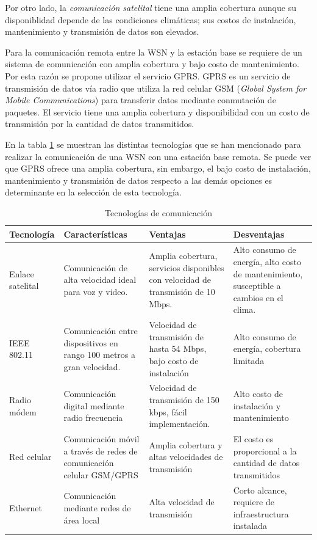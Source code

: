 Por otro lado, la \textit{comunicación satelital} tiene una amplia cobertura aunque su disponiblidad depende de las condiciones climáticas; sus costos de instalación, mantenimiento y transmisión de datos son elevados. 

Para la comunicación remota entre la WSN y la estación base se requiere de un sistema de comunicación con amplia cobertura y bajo costo de mantenimiento. Por esta razón se propone utilizar el servicio GPRS. GPRS es un servicio de transmisión de datos vía radio que utiliza la red celular GSM (\textit{Global System for Mobile Communications}) para transferir datos mediante conmutación de paquetes. El servicio tiene una amplia cobertura y disponibilidad con un costo de transmisión por la cantidad de datos transmitidos. 

En la tabla \ref{tabla:tecnologias_com} se muestran las distintas tecnolog\'ias que se han mencionado para realizar la comunicación de una WSN con una estaci\'on base remota. Se puede ver que GPRS ofrece una amplia cobertura, sin embargo, el bajo costo de instalaci\'on, mantenimiento y transmisi\'on de datos respecto a las demás opciones es determinante en la selecci\'on de esta tecnolog\'ia.  


\begin{table}
	\begin{center}
		\caption{Tecnologías de comunicación}
		\label{tabla:tecnologias_com}
		\small
		\begin{tabular}{p{2cm}p{4cm}p{3.2cm}p{3.2cm}}
		\toprule
		\textbf{Tecnolog\'ia} & \textbf{Caracter\'isticas} & \textbf{Ventajas} & \textbf{Desventajas}\\
		\midrule
		Enlace satelital & Comunicación de alta velocidad ideal para voz y video.  & Amplia cobertura, servicios disponibles con velocidad de transmisión de 10 Mbps. & Alto consumo de energía, alto costo de mantenimiento, susceptible a cambios en el clima.\\
		IEEE 802.11 & Comunicación entre dispositivos en rango 100 metros a gran velocidad. & Velocidad de transmisión de hasta 54 Mbps, bajo costo de instalación & Alto consumo de energía, cobertura limitada\\
		Radio módem & Comunicación digital mediante radio frecuencia & Velocidad de transmisión de 150 kbps, fácil implementación. & Alto costo de instalación y mantenimiento\\
		Red celular & Comunicación móvil a través de redes de comunicación celular GSM/GPRS & Amplia cobertura y altas velocidades de transmisión & El costo es proporcional a la cantidad de datos transmitidos \\
		Ethernet & Comunicación mediante redes de área local & Alta velocidad de transmisión & Corto alcance, requiere de infraestructura instalada\\
		\bottomrule
		\end{tabular}
	\end{center}
\end{table}

